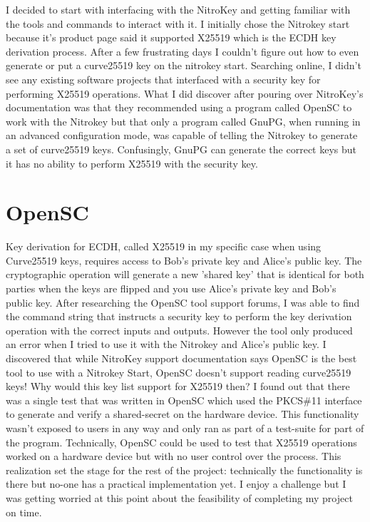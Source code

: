 \documentclass [11pt, proquest] {uwthesis}[2020/02/24]
\begin{document}
I decided to start with interfacing with the NitroKey and getting familiar with the tools and commands to interact with it. I initially chose the Nitrokey start because it's product page said it supported X25519\cite{noauthor_nitrokey_nodate} which is the ECDH key derivation process. After a few frustrating days I couldn't figure out how to even generate or put a curve25519 key on the nitrokey start. Searching online, I didn't see any existing software projects that interfaced with a security key for performing X25519 operations. What I did discover after pouring over NitroKey's documentation was that they recommended using a program called OpenSC to work with the Nitrokey but that only a program called GnuPG, when running in an advanced configuration mode, was capable of telling the Nitrokey to generate a set of curve25519 keys. Confusingly, GnuPG can generate the correct keys but it has no ability to perform X25519 with the security key.

\section {OpenSC}
Key derivation for ECDH, called X25519 in my specific case when using Curve25519 keys, requires access to Bob's private key and Alice's public key. The cryptographic operation will generate a new 'shared key' that is identical for both parties when the keys are flipped and you use Alice's private key and Bob's public key. 
After researching the OpenSC tool support forums, I was able to find the command string that instructs a  security key to perform the key derivation operation with the correct inputs and outputs. However the tool only produced an error when I tried to use it with the Nitrokey and Alice's public key. I discovered that while NitroKey support documentation says OpenSC is the best tool to use with a Nitrokey Start, OpenSC doesn't support reading curve25519 keys! Why would this key list support for X25519 then? I found out that there was a single test that was written in OpenSC which used the PKCS\#11 interface to generate and verify a shared-secret on the hardware device. This functionality wasn't exposed to users in any way and only ran as part of a test-suite for part of the program. Technically, OpenSC could be used to test that X25519 operations worked on a hardware device but with no user control over the process. This realization set the stage for the rest of the project: technically the functionality is there but no-one has a practical implementation yet. I enjoy a challenge but I was getting worried at this point about the feasibility of completing my project on time.
\end{document}
